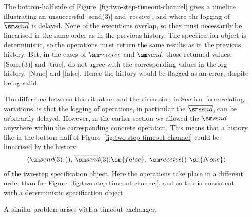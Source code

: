 
The bottom-half side of Figure~\ref{fig:two-step-timeout-channel} gives a
timeline illustrating an unsuccessful |send(3)| and |receive|, and where the
logging of $\overline{\send}$ is delayed.  None of the executions overlap, so
they must necessarily be linearised in the same order as in the previous
history.  The specification object is deterministic, so the operations must
return the same results as in the previous history.  But, in the cases of
$\receive$ and $\overline{\send}$, those returned values, |Some(3)| and
|true|, do not agree with the corresponding values in the log history, |None|
and |false|.  Hence the history would be flagged as an error, despite being
valid.

The difference between this situation and the discussion in
Section~\ref{ssec:relating-variations} is that the logging of
operations, in particular the $\overline{\send}$, can be arbitrarily delayed.
However, in the earlier section we allowed the $\overline{\send}$ anywhere
within the corresponding concrete operation.  This means that a history like
in the bottom-half of Figure~\ref{fig:two-step-timeout-channel} could be
linearised by the history
\[
\seq{ \send(3)\::(),\; \overline{\send}(3)\::\sm{false},\;
  \receive()\::\sm{None} }
\]
of the two-step specification object.  Here the operations take place in a
different order than for Figure~\ref{fig:two-step-timeout-channel}, and so
this is consistent with a deterministic specification object.

A similar problem arises with a timeout exchanger.


